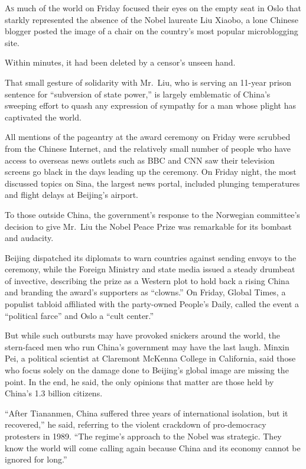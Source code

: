 ﻿\documentclass[12pt]{article}
\begin{document}
\lettrine{A}{s} much of the world on Friday focused their eyes on the empty
seat in Oslo that starkly represented the absence of the Nobel laureate Liu Xiaobo, a lone Chinese
blogger posted the image of a chair on the country's most popular microblogging site.

Within minutes, it had been deleted by a censor's unseen hand.

That small gesture of solidarity with Mr.~Liu, who is serving an 11-year prison sentence for
``subversion of state power,'' is largely emblematic of China's sweeping effort to quash any
expression of sympathy for a man whose plight has captivated the world.

All mentions of the pageantry at the award ceremony on Friday were scrubbed from the Chinese
Internet, and the relatively small number of people who have access to overseas news outlets such as
BBC and CNN saw their television screens go black in the days leading up the ceremony. On Friday
night, the most discussed topics on Sina, the largest news portal, included plunging temperatures
and flight delays at Beijing's airport.

To those outside China, the government's response to the Norwegian committee's decision to give
Mr.~Liu the Nobel Peace Prize was remarkable for its bombast and audacity.

Beijing dispatched its diplomats to warn countries against sending envoys to the ceremony, while the
Foreign Ministry and state media issued a steady drumbeat of invective, describing the prize as a
Western plot to hold back a rising China and branding the award's supporters as ``clowns.'' On
Friday, Global Times, a populist tabloid affiliated with the party-owned People's Daily, called the
event a ``political farce'' and Oslo a ``cult center.''

But while such outbursts may have provoked snickers around the world, the stern-faced men who run
China's government may have the last laugh. Minxin Pei, a political scientist at Claremont McKenna
College in California, said those who focus solely on the damage done to Beijing's global image are
missing the point. In the end, he said, the only opinions that matter are those held by China's 1.3
billion citizens.

``After Tiananmen, China suffered three years of international isolation, but it recovered,'' he
said, referring to the violent crackdown of pro-democracy protesters in 1989. ``The regime's
approach to the Nobel was strategic. They know the world will come calling again because China and
its economy cannot be ignored for long.''
\end{document}
